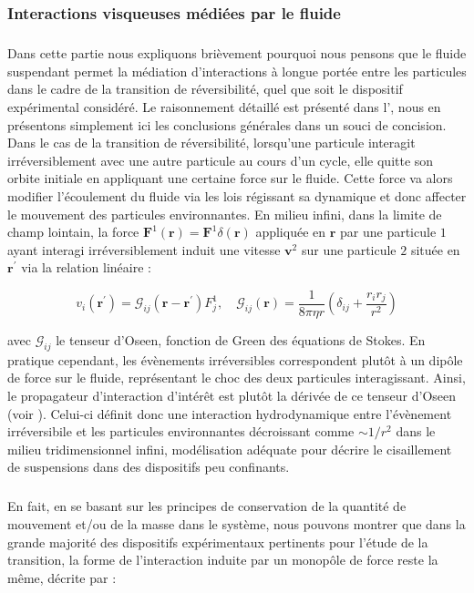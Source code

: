 \subsubsection{Interactions visqueuses médiées par le fluide}

\label{sec:ref_interac_visc}

\subparagraph{}Dans cette partie nous expliquons brièvement pourquoi nous pensons que le fluide suspendant permet la médiation d'interactions à longue portée entre les particules dans le cadre de la transition de réversibilité, quel que soit le dispositif expérimental considéré. Le raisonnement détaillé est présenté dans l', nous en présentons simplement ici les conclusions générales dans un souci de concision. Dans le cas de la transition de réversibilité, lorsqu'une particule interagit irréversiblement avec une autre particule au cours d'un cycle, elle quitte son orbite initiale en appliquant une certaine force sur le fluide. Cette force va alors modifier l'écoulement du fluide via les lois régissant sa dynamique et donc affecter le mouvement des particules environnantes. En milieu infini, dans la limite de champ lointain, la force $\mathbf{F}^1(\mathbf{r})=\mathbf{F}^1\delta(\mathbf{r})$ appliquée en $\mathbf{r}$ par une particule $1$ ayant interagi irréversiblement induit une vitesse $\mathbf{v}^2$ sur une particule $2$ située en $\mathbf{r}^\prime$ via la relation linéaire :

\begin{equation}
	v_i (\mathbf{r}^\prime) = \mathcal{G}_{ij}(\mathbf{r} -\mathbf{r}^\prime)F^1_j, \quad \mathcal{G}_{ij}(\mathbf{r}) = \frac{1}{8\pi\eta r}\left( \delta_{ij}+\frac{r_ir_j}{r^2} \right)
\end{equation}

\noindent avec $\mathcal{G}_{ij}$ le tenseur d'Oseen, fonction de Green des équations de Stokes. En pratique cependant, les évènements irréversibles correspondent plutôt à un dipôle de force sur le fluide, représentant le choc des deux particules interagissant. Ainsi, le propagateur d'interaction d'intérêt est plutôt la dérivée de ce tenseur d'Oseen (voir ). Celui-ci définit donc une interaction hydrodynamique entre l'évènement irréversibile et les particules environnantes décroissant comme $\sim 1/r^2$ dans le milieu tridimensionnel infini, modélisation adéquate pour décrire le cisaillement de suspensions dans des dispositifs peu confinants.

\subparagraph{}En fait, en se basant sur les principes de conservation de la quantité de mouvement et/ou de la masse dans le système, nous pouvons montrer que dans la grande majorité des dispositifs expérimentaux pertinents pour l'étude de la transition, la forme de l'interaction induite par un monopôle de force reste la même, décrite par :

